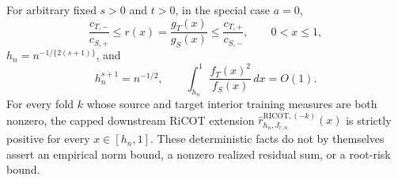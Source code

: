 For arbitrary fixed \(s>0\) and \(t>0\), in the special case \(a=0\),
\[
\frac{c_{T,-}}{c_{S,+}}\le r(x)=\frac{g_T(x)}{g_S(x)}\le\frac{c_{T,+}}{c_{S,-}},\qquad 0<x\le1,
\]
\(h_n=n^{-1/\{2(s+1)\}}\), and
\[
h_n^{s+1}=n^{-1/2},\qquad \int_{h_n}^1\frac{f_T(x)^2}{f_S(x)}\,dx=O(1).
\]
For every fold \(k\) whose source and target interior training measures are both nonzero, the capped downstream RiCOT extension \(\widehat r^{\mathrm{RICOT},(-k)}_{h_n,J_{r,n}}(x)\) is strictly positive for every \(x\in[h_n,1]\). These deterministic facts do not by themselves assert an empirical norm bound, a nonzero realized residual sum, or a root-risk bound.